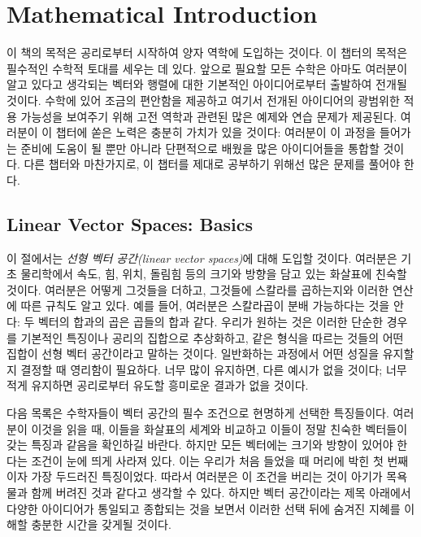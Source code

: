 %
%
%
\chapter{Mathematical Introduction}
\label{ch:1} %


이 책의 목적은 공리로부터 시작하여 양자 역학에 도입하는 것이다. 이 챕터의 목적은 필수적인 수학적 토대를 세우는 데 있다. 앞으로 필요할 모든 수학은 아마도 여러분이 알고 있다고 생각되는 벡터와 행렬에 대한 기본적인 아이디어로부터 출발하여 전개될 것이다. 수학에 있어 조금의 편안함을 제공하고 여기서 전개된 아이디어의 광범위한 적용 가능성을 보여주기 위해 고전 역학과 관련된 많은 예제와 연습 문제가 제공된다. 여러분이 이 챕터에 쏟은 노력은 충분히 가치가 있을 것이다: 여러분이 이 과정을 들어가는 준비에 도움이 될 뿐만 아니라 단편적으로 배웠을 많은 아이디어들을 통합할 것이다. 다른 챕터와 마찬가지로, 이 챕터를 제대로 공부하기 위해선 많은 문제를 풀어야 한다.

\section{Linear Vector Spaces: Basics}

이 절에서는 \emph{선형 벡터 공간(linear vector spaces)}에 대해 도입할 것이다. 여러분은 기초 물리학에서 속도, 힘, 위치, 돌림힘 등의 크기와 방향을 담고 있는 화살표에 친숙할 것이다. 여러분은 어떻게 그것들을 더하고, 그것들에 스칼라를 곱하는지와 이러한 연산에 따른 규칙도 알고 있다. 예를 들어, 여러분은 스칼라곱이 분배 가능하다는 것을 안다: 두 벡터의 합과의 곱은 곱들의 합과 같다. 우리가 원하는 것은 이러한 단순한 경우를 기본적인 특징이나 공리의 집합으로 추상화하고, 같은 형식을 따르는 것들의 어떤 집합이 선형 벡터 공간이라고 말하는 것이다. 일반화하는 과정에서 어떤 성질을 유지할 지 결정할 때 영리함이 필요하다. 너무 많이 유지하면, 다른 예시가 없을 것이다; 너무 적게 유지하면 공리로부터 유도할 흥미로운 결과가 없을 것이다.

다음 목록은 수학자들이 벡터 공간의 필수 조건으로 현명하게 선택한 특징들이다. 여러분이 이것을 읽을 때, 이들을 화살표의 세계와 비교하고 이들이 정말 친숙한 벡터들이 갖는 특징과 같음을 확인하길 바란다. 하지만 모든 벡터에는 크기와 방향이 있어야 한다는 조건이 눈에 띄게 사라져 있다. 이는 우리가 처음 들었을 때 머리에 박힌 첫 번째이자 가장 두드러진 특징이었다. 따라서 여러분은 이 조건을 버리는 것이 아기가 목욕물과 함께 버려진 것과 같다고 생각할 수 있다. 하지만 벡터 공간이라는 제목 아래에서 다양한 아이디어가 통일되고 종합되는 것을 보면서 이러한 선택 뒤에 숨겨진 지혜를 이해할 충분한 시간을 갖게될 것이다. 

